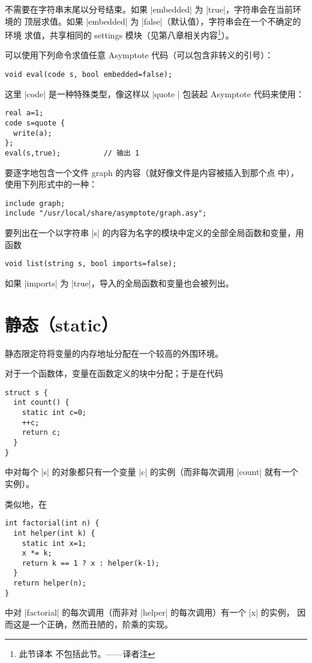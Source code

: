 \documentclass[nofonts,CJKnormalspaces]{ctexbook}[2009/05/20]
\newcommand*\prgname[1]{\textsf{#1}}
\newcommand\transnote[1]{\footnote{#1——译者注}}
\begin{document}
{{{不需要在字符串末尾以分号结束。如果 |embedded| 为 |true|，字符串会在当前环境的
顶层求值。如果 |embedded| 为 |false|（默认值），字符串会在一个不确定的环境
求值，共享相同的 \prgname{settings} 模块（见第八章相关内容\transnote{此节译本
不包括此节。}）。

可以使用下列命令求值任意 \prgname{Asymptote} 代码（可以包含非转义的引号）：
\begin{lstlisting}
void eval(code s, bool embedded=false);
\end{lstlisting}

这里 |code| 是一种特殊类型，像这样以 |quote {}| 包装起 \prgname{Asymptote}
代码来使用：
\begin{lstlisting}
real a=1;
code s=quote {
  write(a);
};
eval(s,true);          // 输出 1
\end{lstlisting}

要逐字地包含一个文件 \prgname{graph} 的内容（就好像文件是内容被插入到那个点
中），使用下列形式中的一种：
\begin{lstlisting}
include graph;
include "/usr/local/share/asymptote/graph.asy";
\end{lstlisting}

要列出在一个以字符串 |s| 的内容为名字的模块中定义的全部全局函数和变量，用函数
\begin{lstlisting}
void list(string s, bool imports=false);
\end{lstlisting}
如果 |imports| 为 |true|，导入的全局函数和变量也会被列出。



\section{静态（static）}
\label{sec:static}

静态限定符将变量的内存地址分配在一个较高的外围环境。

对于一个函数体，变量在函数定义的块中分配；于是在代码
\begin{lstlisting}
struct s {
  int count() {
    static int c=0;
    ++c;
    return c;
  }
}
\end{lstlisting}
中对每个 |s| 的对象都只有一个变量 |c| 的实例（而非每次调用 |count| 就有一个
实例）。

类似地，在
\begin{lstlisting}
int factorial(int n) {
  int helper(int k) {
    static int x=1;
    x *= k;
    return k == 1 ? x : helper(k-1);
  }
  return helper(n);
}
\end{lstlisting}
中对 |factorial| 的每次调用（而非对 |helper| 的每次调用）有一个 |x| 的实例，
因而这是一个正确，然而丑陋的，阶乘的实现。

}}}
\end{document}
